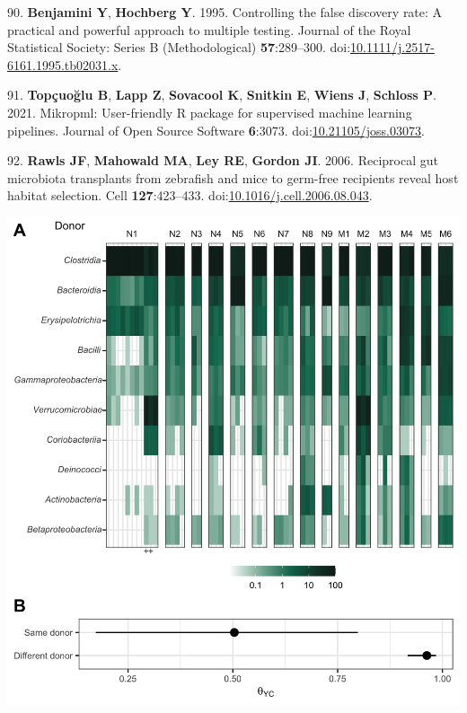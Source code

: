 \documentclass[
  12pt,
]{article}
\newenvironment{cslreferences}%
  {}%
  {\par}
\begin{document}
\begin{cslreferences}
\leavevmode\hypertarget{ref-Benjamini1995}{}%
90. \textbf{Benjamini Y}, \textbf{Hochberg Y}. 1995. Controlling the
false discovery rate: A practical and powerful approach to multiple
testing. Journal of the Royal Statistical Society: Series B
(Methodological) \textbf{57}:289--300.
doi:\href{https://doi.org/10.1111/j.2517-6161.1995.tb02031.x}{10.1111/j.2517-6161.1995.tb02031.x}.

\leavevmode\hypertarget{ref-Topcuoglu2021}{}%
91. \textbf{Topçuoğlu B}, \textbf{Lapp Z}, \textbf{Sovacool K},
\textbf{Snitkin E}, \textbf{Wiens J}, \textbf{Schloss P}. 2021.
Mikropml: User-friendly R package for supervised machine learning
pipelines. Journal of Open Source Software \textbf{6}:3073.
doi:\href{https://doi.org/10.21105/joss.03073}{10.21105/joss.03073}.

\leavevmode\hypertarget{ref-Rawls2006}{}%
92. \textbf{Rawls JF}, \textbf{Mahowald MA}, \textbf{Ley RE},
\textbf{Gordon JI}. 2006. Reciprocal gut microbiota transplants from
zebrafish and mice to germ-free recipients reveal host habitat
selection. Cell \textbf{127}:423--433.
doi:\href{https://doi.org/10.1016/j.cell.2006.08.043}{10.1016/j.cell.2006.08.043}.
\end{cslreferences}

\newpage

\includegraphics{../results/figures/figure_1.jpg}
\end{document}
